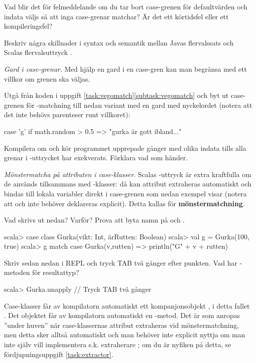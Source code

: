 \Subtask Vad blir det för felmeddelande om du tar bort case-grenen för defaultvärden och indata väljs så att inga case-grenar matchar? Är det ett körtidsfel eller ett kompileringsfel?


\Subtask\Pen Beskriv några skillnader i syntax och semantik mellan Javas flervalssats  och Scalas flervalsuttryck .




\Task \emph{Gard i case-grenar.} Med hjälp en gard  i en case-gren kan man begränsa med ett villkor om grenen ska väljas. 

Utgå från koden i uppgift \ref{task:vegomatch}\ref{subtask:vegomatch} och byt ut case-grenen för -matchning till nedan variant med en gard med nyckelordet  (notera att det inte behövs parenteser runt villkoret):
\begin{Code}
    case 'g' if math.random > 0.5 => "gurka är gott ibland..."
\end{Code}
Kompilera om och kör programmet upprepade gånger med olika indata tills alla grenar i -uttrycket har exekverats. Förklara vad som händer.

\Task \label{task:match-caseclass} \emph{Mönstermatcha på attributen i case-klasser.} Scalas -uttryck är extra kraftfulla om de används tillsammans med -klasser: då kan attribut extraheras automatiskt och bindas till lokala variabler direkt i case-grenen som nedan exempel visar (notera att  och  inte behöver deklareras explicit). Detta kallas för \textbf{mönstermatchning}.  

\Subtask \label{subtask:autobinding-match} Vad skrivs ut nedan? Varför? Prova att byta namn på  och .
\begin{REPL}
scala> case class Gurka(vikt: Int, ärRutten: Boolean)
scala> val g = Gurka(100, true)
scala> g match { case Gurka(v,rutten) => println("G" + v + rutten) }
\end{REPL}

\Subtask Skriv sedan nedan i REPL och tryck TAB två gånger efter punkten. Vad har -metoden för resultattyp?  
\begin{REPL}
scala> Gurka.unapply   // Tryck TAB två gånger
\end{REPL}
\begin{Background}
Case-klasser får av kompilatorn automatiskt ett kompanjonsobjekt , i detta fallet . Det objektet får av kompilatorn automatiskt en -metod. Det är  som anropas ''under huven'' när case-klassernas attribut extraheras vid mönstermatchning, men detta sker alltså automatiskt och man behöver inte explicit nyttja  om man inte själv vill implementera s.k. extraherare ; om du är nyfiken på detta, se fördjupningsuppgift \ref{task:extractor}.
\end{Background}

